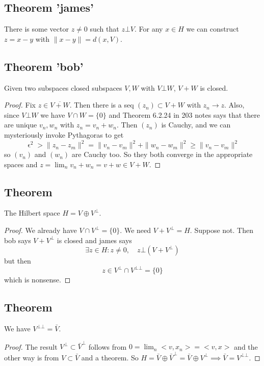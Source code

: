 \documentclass{article}
\DeclareMathOperator\eps{\epsilon}
\DeclareMathOperator\op{\oplus}
\begin{document}
\subsection*{Theorem 'james'}
There is some vector $z \neq 0$ such that $z \bot V$.
For any $x \in H$ we can construct $z = x-y$ with $\|x-y\| = d(x,V)$.
\subsection*{Theorem 'bob'}
Given two subspaces closed subspaces $V,W$ with $V \bot W$, $V+W$ is closed.
\begin{proof}
Fix $z \in \overline{V+W}$. Then there is a seq $(z_n) \subset V + W$ with $z_n \to z$. Also, since $V \bot W$ we have $V \cap W = \{ 0 \}$ and Theorem 6.2.24
in 203 notes says that there are unique $v_n,w_n$ with $z_n = v_n + w_n$.
Then $(z_n)$ is Cauchy, and we can mysteriously invoke Pythagoras to get $$
\eps^2 > \|z_n-z_m\|^2 = \|v_n-v_m\|^2 + \|w_n-w_m\|^2 \geq \|v_n-v_m\|^2
$$
so $(v_n)$ and $(w_n)$ are Cauchy too. So they both converge in the appropriate spaces and $z = \lim_n v_n + w_n = v+ w \in V + W$.
\end{proof}
\subsection*{Theorem}
The Hilbert space $H = V \op V^{\bot}$.
\begin{proof}
We already have $V \cap V^{\bot} =\{ 0 \}$. We need $V + V^{\bot} = H$.
Suppose not. Then bob says $V+V^{\bot}$ is closed and james says $$
\exists z \in H: z \neq 0, \quad z \bot (V+V^{\bot})
$$
but then $$
z \in V^{\bot} \cap V^{\bot \bot} = \{ 0 \}
$$
which is nonsense.
\end{proof}
\subsection*{Theorem}
We have $V^{\bot \bot} = \bar{V}$.
\begin{proof}
The result $V^{\bot} \subset \bar{V}^{\bot}$ follows
from $0 = \lim_n < v,x_n > = <v,x>$ and the other way is
from $V \subset \bar{V}$ and a theorem. So $ H = \bar{V} \op \bar{V}^{\bot} = \bar{V} \op V^\bot \implies \bar{V} = V^{\bot \bot}$.
\end{proof}
\end{document}
